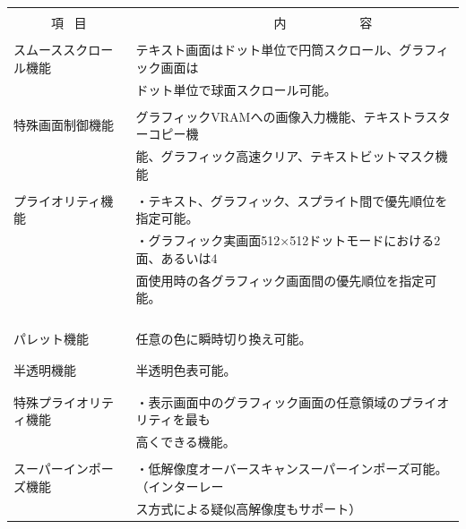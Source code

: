 ﻿\documentclass[twoside,a4paper,12pt]{article}
\begin{document}
\setlength{\tabcolsep}{0.5mm}
\begin{tabular}{|p{44mm}|p{123mm}|}
\hline
&\\[-2mm]
\ \ \ \ \ \ 項 \ 目 & \ \ \ \ \ \ \ \ \ \ \ \ \ \ \ \ \ \ \ \ \ \ 内 \ \ \ \ \ \ \ \ \ \ \ 容\\[4mm]
\hline
&\\[-3mm]
スムーススクロール機能 & テキスト画面はドット単位で円筒スクロール、グラフィック画面は\\
& ドット単位で球面スクロール可能。\\
\hline
&\\[-3mm]
特殊画面制御機能 & グラフィックVRAMへの画像入力機能、テキストラスターコピー機\\
& 能、グラフィック高速クリア、テキストビットマスク機能\\
\hline
&\\[-3mm]
プライオリティ機能 & ・テキスト、グラフィック、スプライト間で優先順位を指定可能。\\
& ・グラフィック実画面512×512ドットモードにおける2面、あるいは4\\
& 面使用時の各グラフィック画面間の優先順位を指定可能。\\
&\\
&\\
&\\
\hline
&\\[-3mm]
パレット機能 & 任意の色に瞬時切り換え可能。\\
&\\
\hline
&\\[-3mm]
半透明機能 & 半透明色表可能。\\
&\\
\hline
&\\[-3mm]
特殊プライオリティ機能 & ・表示画面中のグラフィック画面の任意領域のプライオリティを最も\\
& 高くできる機能。\\
\hline
&\\[-3mm]
スーパーインポーズ機能 & ・低解像度オーバースキャンスーパーインポーズ可能。（インターレー\\
& ス方式による疑似高解像度もサポート）\\
\hline
\end{tabular}\\[1mm]
\end{document}
